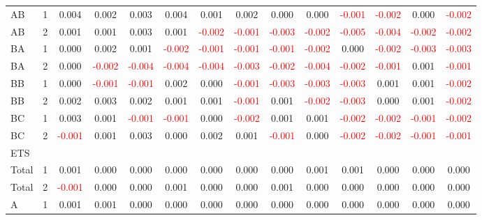 \begin{table}[H]
{\begin{tabular}{llcccccccccccc}
AB & 1 & 0.004 & 0.002 & 0.003 & 0.004 & 0.001 & 0.002 & 0.000 & 0.000 & \textcolor{red}{-0.001} & \textcolor{red}{-0.002} & 0.000 & \textcolor{red}{-0.002}\\
AB & 2 & 0.001 & 0.001 & 0.003 & 0.001 & \textcolor{red}{-0.002} & \textcolor{red}{-0.001} & \textcolor{red}{-0.003} & \textcolor{red}{-0.002} & \textcolor{red}{-0.005} & \textcolor{red}{-0.004} & \textcolor{red}{-0.002} & \textcolor{red}{-0.002}\\
BA & 1 & 0.000 & 0.002 & 0.001 & \textcolor{red}{-0.002} & \textcolor{red}{-0.001} & \textcolor{red}{-0.001} & \textcolor{red}{-0.001} & \textcolor{red}{-0.002} & 0.000 & \textcolor{red}{-0.002} & \textcolor{red}{-0.003} & \textcolor{red}{-0.003}\\
BA & 2 & 0.000 & \textcolor{red}{-0.002} & \textcolor{red}{-0.004} & \textcolor{red}{-0.004} & \textcolor{red}{-0.004} & \textcolor{red}{-0.003} & \textcolor{red}{-0.002} & \textcolor{red}{-0.004} & \textcolor{red}{-0.002} & \textcolor{red}{-0.001} & 0.001 & \textcolor{red}{-0.001}\\
BB & 1 & 0.000 & \textcolor{red}{-0.001} & \textcolor{red}{-0.001} & 0.002 & 0.000 & \textcolor{red}{-0.001} & \textcolor{red}{-0.003} & \textcolor{red}{-0.003} & \textcolor{red}{-0.003} & 0.001 & 0.001 & \textcolor{red}{-0.002}\\
BB & 2 & 0.002 & 0.003 & 0.002 & 0.001 & 0.001 & \textcolor{red}{-0.001} & 0.001 & \textcolor{red}{-0.002} & \textcolor{red}{-0.003} & 0.000 & 0.001 & \textcolor{red}{-0.002}\\
BC & 1 & 0.003 & 0.001 & \textcolor{red}{-0.001} & \textcolor{red}{-0.001} & 0.000 & \textcolor{red}{-0.002} & 0.001 & 0.001 & \textcolor{red}{-0.002} & \textcolor{red}{-0.002} & \textcolor{red}{-0.001} & \textcolor{red}{-0.002}\\
BC & 2 & \textcolor{red}{-0.001} & 0.001 & 0.003 & 0.000 & 0.002 & 0.001 & \textcolor{red}{-0.001} & 0.000 & \textcolor{red}{-0.002} & \textcolor{red}{-0.002} & \textcolor{red}{-0.001} & \textcolor{red}{-0.001}\\
\hline
ETS &  &  &  &  &  &  &  &  &  &  &  &  & \\
\hline
Total & 1 & 0.001 & 0.000 & 0.000 & 0.000 & 0.000 & 0.000 & 0.000 & 0.001 & 0.001 & 0.000 & 0.000 & 0.000\\
Total & 2 & \textcolor{red}{-0.001} & 0.000 & 0.000 & 0.001 & 0.000 & 0.000 & 0.001 & 0.000 & 0.000 & 0.000 & 0.000 & 0.000\\
A & 1 & 0.001 & 0.001 & 0.000 & 0.000 & 0.000 & 0.000 & 0.000 & 0.000 & 0.000 & 0.000 & 0.000 & 0.000\\

\end{tabular}}
\end{table}
